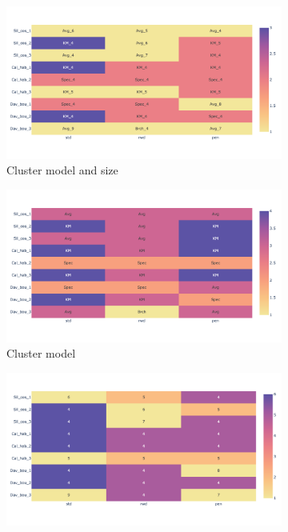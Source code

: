 \begin{figure}[H]
    \centering
    \begin{subfigure}[b]{0.49\textwidth}
        \centering
        \includegraphics[width=\textwidth,keepaspectratio]{Sections/Network_I/Resources/P0/top3_cs_gen_p0_tum4K.png}    
        \caption{Cluster model and size}
    \end{subfigure}
    \hfill
    \begin{subfigure}[b]{0.49\textwidth}
        \centering
        \includegraphics[width=\textwidth,keepaspectratio]{Sections/Network_I/Resources/P0/top3_cs_model_p0_tum4K.png}
        \caption{Cluster model}
    \end{subfigure} %
    \hfill
    \begin{subfigure}[b]{0.49\textwidth}
        \centering
        \includegraphics[width=\textwidth,keepaspectratio]{Sections/Network_I/Resources/P0/top3_cs_size_p0_tum4K.png}

\end{subfigure}
\end{figure}
